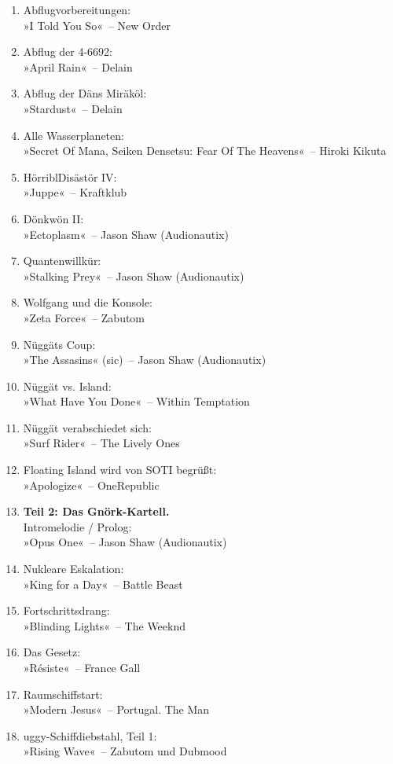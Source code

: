 \begin{enumerate}
    \item Abflugvorbereitungen:\\ »I Told You So«~– New Order
    \item Abflug der 4-6692:\\ »April Rain«~– Delain
    \item Abflug der Däns Miräköl:\\ »Stardust«~– Delain
    \item Alle Wasserplaneten:\\ »Secret Of Mana, Seiken Densetsu: Fear Of The Heavens«~– Hiroki Kikuta
    \item HörriblDisästör IV:\\ »Juppe«~– Kraftklub
    \item Dönkwön II:\\ »Ectoplasm«~– Jason Shaw (Audionautix)
    \item Quantenwillkür:\\ »Stalking Prey«~– Jason Shaw (Audionautix)
    \item Wolfgang und die Konsole:\\ »Zeta Force«~– Zabutom
    \item Nüggäts Coup:\\ »The Assasins« (sic)~– Jason Shaw (Audionautix)
    \item Nüggät vs. Island:\\ »What Have You Done«~– Within Temptation
    \item Nüggät verabschiedet sich:\\ »Surf Rider«~– The Lively Ones
    \item Floating Island wird von SOTI begrüßt:\\ »Apologize«~– OneRepublic
    \item \textbf{Teil 2: Das Gnörk-Kartell.}\\ Intromelodie / Prolog:\\ »Opus One«~– Jason Shaw (Audionautix)
    \item Nukleare Eskalation:\\ »King for a Day«~– Battle Beast
    \item Fortschrittsdrang:\\ »Blinding Lights«~– The Weeknd
    \item Das Gesetz:\\ »Résiste«~– France Gall
    \item Raumschiffstart:\\ »Modern Jesus«~– Portugal. The Man
    \item uggy-Schiffdiebstahl, Teil 1:\\ »Rising Wave«~– Zabutom und Dubmood

\end{enumerate}
